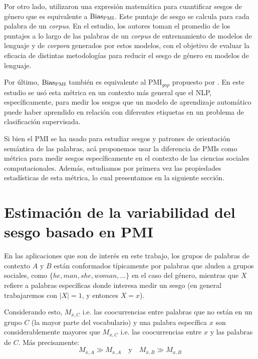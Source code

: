 Por otro lado, \citet{bordia2019identifying} utilizaron una expresión matemática para cuantificar sesgos de género que es equivalente a $\operatorname{Bias_{PMI}}$. Este puntaje de sesgo se calcula para cada palabra de un \emph{corpus}. En el estudio, los autores toman el promedio de los puntajes a lo largo de las palabras de un \emph{corpus} de entrenamiento de modelos de lenguaje y de \emph{corpora} generados por estos modelos, con el objetivo de evaluar la eficacia de distintas metodologías para reducir el sesgo de género en modelos de lenguaje. 

Por último, $\operatorname{Bias_{PMI}}$ también es equivalente al $\text{PMI}_{gap}$ propuesto por \citet{aka2021measuring}. En este estudio se usó esta métrica en un contexto más general que el NLP, específicamente, para medir los sesgos que un modelo de aprendizaje automático puede haber aprendido en relación con diferentes etiquetas en un problema de clasificación supervisada.

Si bien el PMI se ha usado para estudiar sesgos y patrones de orientación semántica de las palabras, acá proponemos usar la diferencia de PMIs como métrica para medir sesgos específicamente en el contexto de las ciencias sociales computacionales. Además, estudiamos por primera vez las propiedades estadísticas de esta métrica, lo cual presentamos en la siguiente sección.

\section{Estimación de la variabilidad del sesgo basado en PMI} \label{sec:bias_pmi_variabilidad}


En las aplicaciones que son de interés en este trabajo, los grupos de palabras de contexto $A$ y $B$ están conformados típicamente por palabras que aluden a grupos sociales, como $\{he,man,she,woman,...\}$ en el caso del género, mientras que $X$ refiere a palabras específicas donde interesa medir un sesgo (en general trabajaremos con $|X|=1$, y entonces $X=x$). 

Considerando esto, $M_{\bar{x},C}$ i.e. las coocurrencias entre palabras que no están en un grupo $C$ (la mayor parte del vocabulario) y una palabra específica $x$ son considerablemente mayores que $M_{x,C}$ i.e. las coocurrencias entre $x$ y las palabras de $C$. Más precisamente:
%
\begin{equation} \label{eq:cooc_approximation}
    M_{\bar{x},A} \gg M_{x,A} \quad 
    \text{y} \quad 
    M_{\bar{x},B} \gg M_{x,B}
\end{equation}

